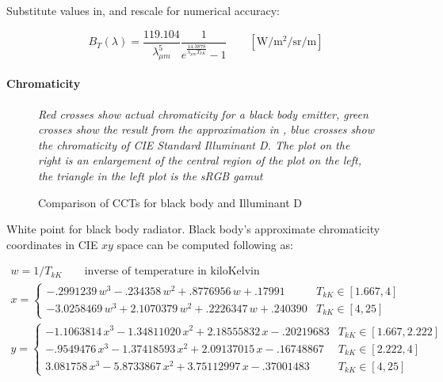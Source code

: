 Substitute values in, and rescale for numerical accuracy:

\begin{equation}
B_T(\lambda) = \frac{119.104}{\lambda_{\mu m}^5} \frac
1{e^{\frac{14.3878}{\lambda_{\mu m} T_{kK}}}-1}
\qquad \left[\si{\watt\per\square\meter\per\steradian\per\meter}\right]
\end{equation}

\paragraph{Chromaticity}

\begin{figure}
{
\centering
\begin{minipage}{.4\textwidth}

\end{minipage}
\begin{minipage}{.4\textwidth}

\end{minipage}

\caption{Comparison of CCTs for black body and Illuminant D}
\label{fig:blackbodychroma}
}
\vskip 1mm
{\footnotesize\it Red crosses show actual chromaticity for a black body
emitter, green crosses show the result from the approximation in
\cite{kang02}, blue crosses show the chromaticity of CIE Standard
Illuminant D. The plot on the right is an enlargement of the
central region of the plot on the left, the triangle in the left plot
is the sRGB gamut}
\end{figure}

White point for black body radiator. Black body's approximate chromaticity
coordinates in CIE $xy$ space can be computed following \cite{kang02} as:

\begin{equation}
\begin{array}{l}
w = 1/T_{kK} \qquad \text{inverse of temperature in kiloKelvin} \\[1mm]
x = \begin{cases}
     - .2991239\,w^3 -  .234358 \,w^2  +  .8776956\,w  + .17991 & T_{kK} \in [1.667, 4] \\
     -3.0258469\,w^3 + 2.1070379\,w^2  +  .2226347\,w  + .240390 & T_{kK} \in [4, 25]
    \end{cases} \\[1mm]
y = \begin{cases}
     -1.1063814\,x^3 - 1.34811020\,x^2 + 2.18555832\,x - .20219683 & T_{kK} \in [1.667, 2.222] \\
     - .9549476\,x^3 - 1.37418593\,x^2 + 2.09137015\,x - .16748867 & T_{kK} \in [2.222, 4] \\
      3.081758 \,x^3 - 5.8733867 \,x^2 + 3.75112997\,x - .37001483 & T_{kK} \in [4, 25]
    \end{cases} 
\end{array}
\end{equation}

